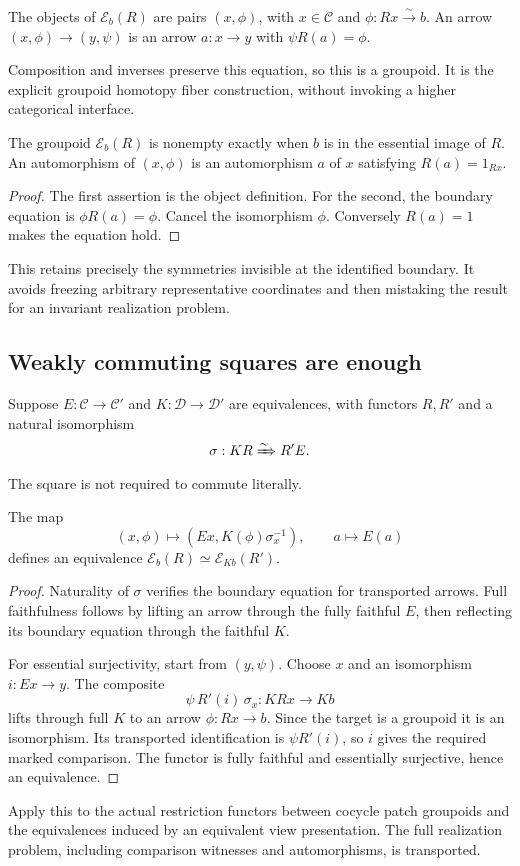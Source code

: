 \begin{definition}
The objects of \(\mathcal E_b(R)\) are pairs \((x,\phi)\), with \(x\in\mathcal C\) and \(\phi:Rx\xrightarrow{\sim}b\). An arrow \((x,\phi)\to(y,\psi)\) is an arrow \(a:x\to y\) with \(\psi R(a)=\phi\).
\end{definition}
Composition and inverses preserve this equation, so this is a groupoid. It is the explicit groupoid homotopy fiber construction, without invoking a higher categorical interface.

\begin{proposition}\label{KS38}
The groupoid \(\mathcal E_b(R)\) is nonempty exactly when \(b\) is in the essential image of \(R\). An automorphism of \((x,\phi)\) is an automorphism \(a\) of \(x\) satisfying \(R(a)=1_{Rx}\).
\end{proposition}
\begin{proof}
The first assertion is the object definition. For the second, the boundary equation is \(\phi R(a)=\phi\). Cancel the isomorphism \(\phi\). Conversely \(R(a)=1\) makes the equation hold.
\end{proof}
This retains precisely the symmetries invisible at the identified boundary. It avoids freezing arbitrary representative coordinates and then mistaking the result for an invariant realization problem.

\subsection{Weakly commuting squares are enough}
Suppose \(E:\mathcal C\to\mathcal C'\) and \(K:\mathcal D\to\mathcal D'\) are equivalences, with functors \(R,R'\) and a natural isomorphism
\[
 \sigma:KR\xRightarrow{\sim}R'E.
\]
The square is not required to commute literally.

\begin{theorem}\label{KS39}
The map
\[
 (x,\phi)\longmapsto(Ex,K(\phi)\sigma_x^{-1}),\qquad a\longmapsto E(a)
\]
defines an equivalence \(\mathcal E_b(R)\simeq\mathcal E_{Kb}(R')\).
\end{theorem}
\begin{proof}
Naturality of \(\sigma\) verifies the boundary equation for transported arrows. Full faithfulness follows by lifting an arrow through the fully faithful \(E\), then reflecting its boundary equation through the faithful \(K\).

For essential surjectivity, start from \((y,\psi)\). Choose \(x\) and an isomorphism \(i:Ex\to y\). The composite
\[
 \psi\,R'(i)\,\sigma_x:KRx\to Kb
\]
lifts through full \(K\) to an arrow \(\phi:Rx\to b\). Since the target is a groupoid it is an isomorphism. Its transported identification is \(\psi R'(i)\), so \(i\) gives the required marked comparison. The functor is fully faithful and essentially surjective, hence an equivalence.
\end{proof}
Apply this to the actual restriction functors between cocycle patch groupoids and the equivalences induced by an equivalent view presentation. The full realization problem, including comparison witnesses and automorphisms, is transported.

